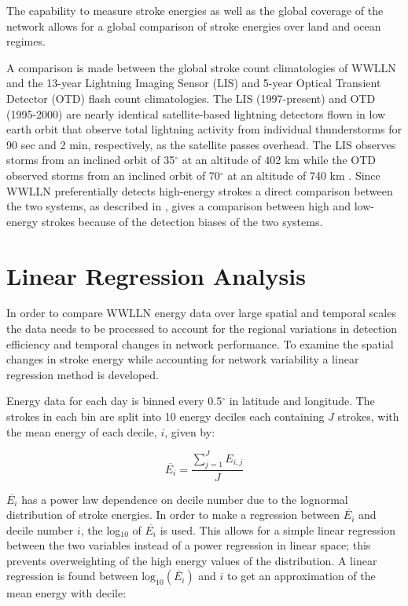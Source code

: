 The capability to measure stroke energies as well as the global coverage of the network allows for a global comparison of stroke energies over land and ocean regimes.

A comparison is made between the global stroke count climatologies of WWLLN and the 13-year Lightning Imaging Sensor (LIS) and 5-year Optical Transient Detector (OTD) flash count climatologies. 
The LIS (1997-present) and OTD (1995-2000) are nearly identical satellite-based lightning detectors flown in low earth orbit that observe total lightning activity from individual thunderstorms for 90 sec and 2 min, respectively, as the satellite passes overhead.
The LIS observes storms from an inclined orbit of 35$^\circ$ at an altitude of 402 km while the OTD observed storms from an inclined orbit of 70$^\circ$ at an altitude of 740 km \citep{Christian1999, Christian2003}.
Since WWLLN preferentially detects high-energy strokes \citep{Hutchins2012a} a direct comparison between the two systems, as described in \citet{Virts2013}, gives a comparison between high and low-energy strokes because of the detection biases of the two systems.

\section{Linear Regression Analysis}
\label{landsea:section:secLinReg}

In order to compare WWLLN energy data over large spatial and temporal scales the data needs to be processed to account for the regional variations in detection efficiency and temporal changes in network performance.
To examine the spatial changes in stroke energy while accounting for network variability a linear regression method is developed.

Energy data for each day is binned every 0.5$^\circ$ in latitude and longitude.
The strokes in each bin are split into 10 energy deciles each containing $J$ strokes, with the mean energy of each decile, $i$, given by:

\begin{equation}
\overline{E_i} = \frac{\sum_{j=1}^J E_{i,j}}{J} 
\end{equation}

$\overline{E_i}$ has a power law dependence on decile number due to the lognormal distribution of stroke energies.
In order to make a regression between $\overline{E_i}$ and decile number $i$, the log$_{10}$ of $\overline{E_i}$ is used.
This allows for a simple linear regression between the two variables instead of a power regression in linear space; this prevents overweighting of the high energy values of the distribution. 
A linear regression is found between $\text{log}_{10}(\bar{E_i})$ and $i$ to get an approximation of the mean energy with decile:


